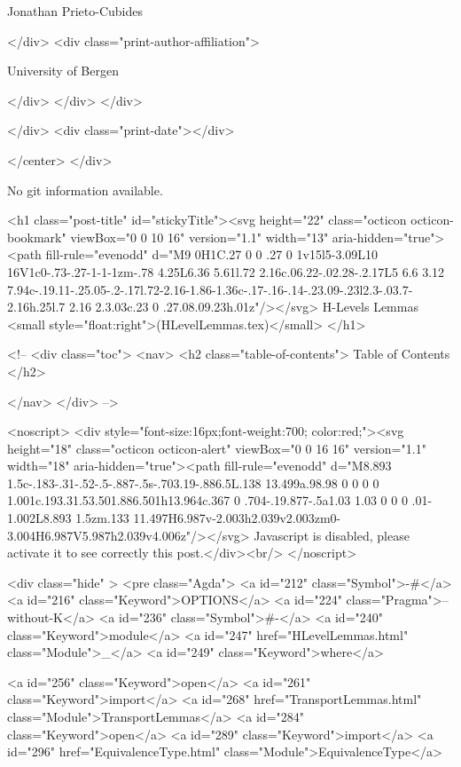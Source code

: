                   Jonathan Prieto-Cubides
                
              </div>
              <div class="print-author-affiliation">
                
                  University of Bergen
                
                </div>
            </div>
          </div>
          
          
        </div>
        <div class="print-date"></div>
        
        
    </center>
  </div>

  
  No git information available.
  

  <h1 class="post-title" id="stickyTitle"><svg height="22" class="octicon octicon-bookmark" viewBox="0 0 10 16" version="1.1" width="13" aria-hidden="true"><path fill-rule="evenodd" d="M9 0H1C.27 0 0 .27 0 1v15l5-3.09L10 16V1c0-.73-.27-1-1-1zm-.78 4.25L6.36 5.61l.72 2.16c.06.22-.02.28-.2.17L5 6.6 3.12 7.94c-.19.11-.25.05-.2-.17l.72-2.16-1.86-1.36c-.17-.16-.14-.23.09-.23l2.3-.03.7-2.16h.25l.7 2.16 2.3.03c.23 0 .27.08.09.23h.01z"/></svg> H-Levels Lemmas <small style="float:right">(HLevelLemmas.tex)</small>
  </h1>

  <!-- 
  <div class="toc">
    <nav>
    <h2 class="table-of-contents"> Table of Contents </h2>
      

    </nav>
  </div>
   -->

  <noscript>
  <div style="font-size:16px;font-weight:700; color:red;"><svg height="18" class="octicon octicon-alert" viewBox="0 0 16 16" version="1.1" width="18" aria-hidden="true"><path fill-rule="evenodd" d="M8.893 1.5c-.183-.31-.52-.5-.887-.5s-.703.19-.886.5L.138 13.499a.98.98 0 0 0 0 1.001c.193.31.53.501.886.501h13.964c.367 0 .704-.19.877-.5a1.03 1.03 0 0 0 .01-1.002L8.893 1.5zm.133 11.497H6.987v-2.003h2.039v2.003zm0-3.004H6.987V5.987h2.039v4.006z"/></svg> Javascript is disabled, please activate it to see correctly this post.</div><br/>
  </noscript>

  <div class="hide" >
<pre class="Agda">
<a id="212" class="Symbol">{-#</a> <a id="216" class="Keyword">OPTIONS</a> <a id="224" class="Pragma">--without-K</a> <a id="236" class="Symbol">#-}</a>
<a id="240" class="Keyword">module</a> <a id="247" href="HLevelLemmas.html" class="Module">_</a> <a id="249" class="Keyword">where</a>

<a id="256" class="Keyword">open</a> <a id="261" class="Keyword">import</a> <a id="268" href="TransportLemmas.html" class="Module">TransportLemmas</a>
<a id="284" class="Keyword">open</a> <a id="289" class="Keyword">import</a> <a id="296" href="EquivalenceType.html" class="Module">EquivalenceType</a>




